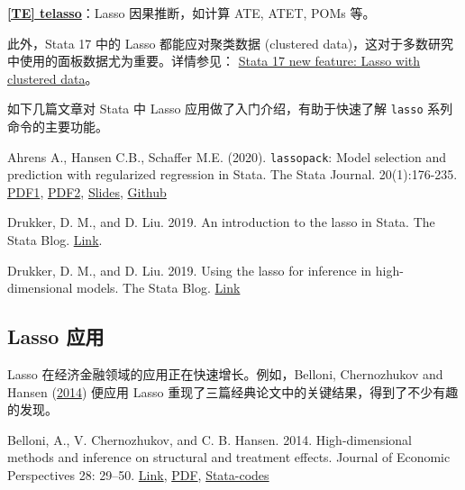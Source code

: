 {\href{https://www.stata.com/manuals/tetelasso.pdf}{\bfseries{[\MakeUppercase{te}] telasso}}：Lasso 因果推断，如计算 ATE, ATET, POMs 等。

\vspace{5pt}
此外，Stata 17 中的 Lasso 都能应对聚类数据 (clustered data)，这对于多数研究中使用的面板数据尤为重要。详情参见： \href{https://www.stata.com/new-in-stata/lasso-with-clustered-data/}{Stata 17 new feature: Lasso with clustered data}。

\vspace{5pt}
如下几篇文章对 Stata 中 Lasso 应用做了入门介绍，有助于快速了解 \texttt{lasso} 系列命令的主要功能。

Ahrens A., Hansen C.B., Schaffer M.E. (2020). \texttt{lassopack}: Model selection and prediction with regularized regression in Stata. The Stata Journal. 20(1):176-235. \href{https://arxiv.org/pdf/1901.05397.pdf}{PDF1}, \href{https://sci-hub.ren/10.1177/1536867X20909697}{PDF2}, \href{https://www.stata.com/meeting/uk18/}{Slides}, \href{https://statalasso.github.io/docs/lassopack/}{Github}

Drukker, D. M., and D. Liu. 2019. An introduction to the lasso in Stata. The Stata Blog.
\href{https://blog.stata.com/2019/09/09/an-introduction-to-the-lasso-in-stata/}{Link}.

Drukker, D. M., and D. Liu. 2019. Using the lasso for inference in high-dimensional models. The Stata Blog.
\href{https://blog.stata.com/2019/09/09/using-the-lasso-for-inference-in-high-dimensional-models/}{Link}




\subsection{Lasso 应用}

Lasso 在经济金融领域的应用正在快速增长。例如，Belloni, Chernozhukov and Hansen (\href{https://doi.org/10.1257/jep.28.2.29}{2014}) 便应用 Lasso 重现了三篇经典论文中的关键结果，得到了不少有趣的发现。

Belloni, A., V. Chernozhukov, and C. B. Hansen. 2014. 
High-dimensional methods and inference on structural and treatment effects. 
Journal of Economic Perspectives 28: 29–50. \href{https://doi.org/10.1257/jep.28.2.29}{Link}, \href{http://sci-hub.ren/10.1257/jep.28.2.29}{PDF}, \href{https://academic.oup.com/restud/article/81/2/608/1523757}{Stata-codes}
\vspace{3pt}

}
